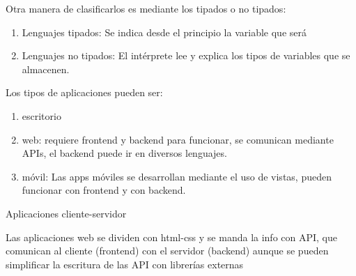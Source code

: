 \documentclass{article}
\begin{document}
  Otra manera de clasificarlos es mediante los tipados o no tipados:
  \begin{enumerate}
    \item Lenguajes tipados: Se indica desde el principio la variable que será
    \item Lenguajes no tipados: El intérprete lee y explica los tipos de variables que se almacenen.
  \end{enumerate}
  Los tipos de aplicaciones pueden ser:
  \begin{enumerate}
    \item escritorio
    \item web: requiere frontend y backend para funcionar, se comunican mediante APIs, el backend puede ir en diversos lenguajes.
    \item móvil: Las apps móviles se desarrollan mediante el uso de vistas, pueden funcionar con frontend y con backend.
  \end{enumerate}
  \begin{center}
    Aplicaciones cliente-servidor
  \end{center}
  Las aplicaciones web se dividen con html-css y se manda la info con API, que comunican al cliente (frontend) con el servidor (backend) aunque se pueden simplificar la escritura de las API con librerías externas
\end{document}
